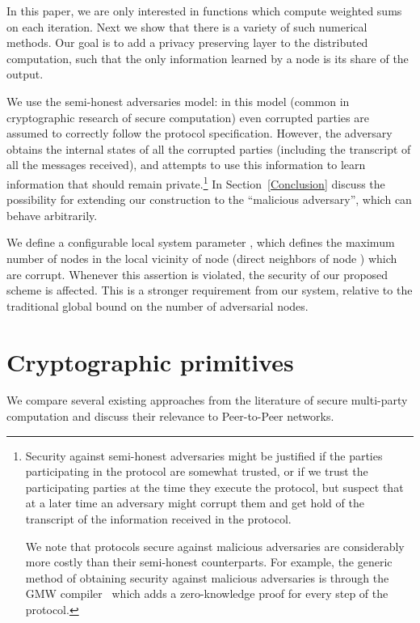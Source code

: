 \documentclass[times, 10pt,twocolumn]{article}
\begin{document}
In this paper, we are only interested in functions  which
compute weighted sums on each iteration. Next we show that there
is a variety of such numerical methods. Our goal is to add a
privacy preserving layer to the distributed computation, such that
the only information learned by a node is its share of the output.



We use the semi-honest adversaries model: in this model (common in
cryptographic research of secure computation) even corrupted parties
are assumed to correctly follow the protocol specification. However,
the adversary obtains the internal states of all the corrupted parties
(including the transcript of all the messages received), and attempts
to use this information to learn information that should remain
private.\footnote{Security against semi-honest adversaries might be
  justified if the parties participating in the protocol are somewhat
  trusted, or if we trust the participating parties at the time they
  execute the protocol, but suspect that at a later time an adversary
  might corrupt them and get hold of the transcript of the information
  received in the protocol.

  We note that protocols secure against malicious adversaries are
  considerably more costly than their semi-honest counterparts. For
  example, the generic method of obtaining security against malicious
  adversaries is through the GMW compiler~\cite{GMW} which adds a
  zero-knowledge proof for every step of the protocol.}  In
Section~\ref{Conclusion} discuss the possibility for extending our
construction to the ``malicious adversary'', which can behave
arbitrarily.



We define a configurable local system parameter , which
defines the maximum number of nodes in the local vicinity of node 
(direct neighbors of node ) which are corrupt. Whenever this
assertion is violated, the security of our proposed scheme is
affected. This is a stronger requirement from our system, relative
to the traditional global bound on the number of adversarial
nodes.
\section{Cryptographic primitives}
\label{crypto} We compare several existing approaches from the
literature of secure multi-party computation and discuss their
relevance to Peer-to-Peer networks.
\end{document}
